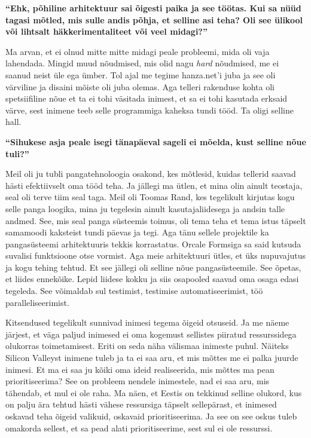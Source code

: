 \textbf{\enquote{Ehk, põhiline arhitektuur sai õigesti paika ja see töötas. Kui 
sa nüüd tagasi mõtled, mis sulle andis põhja, et selline asi teha? Oli see 
ülikool või lihtsalt häkkerimentaliteet või veel midagi?}}

Ma arvan, et ei olnud mitte mitte midagi peale probleemi, mida oli vaja 
lahendada. Mingid muud nõudmised, mis olid nagu \emph{hard} nõudmised, me ei 
saanud neist üle ega ümber. Tol ajal me tegime hanza.net'i 
juba ja see oli värviline ja disaini mõiste oli juba olemas. Aga telleri 
rakenduse kohta oli spetsiifiline nõue et ta ei tohi väsitada inimest, et sa ei 
tohi kasutada erksaid värve, sest inimene teeb selle programmiga kaheksa tundi 
tööd. Ta oligi selline hall.

\textbf{\enquote{Sihukese asja peale isegi tänapäeval sageli ei mõelda, kust 
selline nõue tuli?}}

Meil oli ju tubli pangatehnoloogia osakond, kes mõtlesid, kuidas tellerid saavad 
hästi efektiivselt oma tööd teha. Ja jällegi ma ütlen, et mina olin ainult 
teostaja, seal oli terve tiim seal taga. Meil oli Toomas Rand, kes tegelikult kirjutas kogu selle panga loogika, mina ju tegelesin 
ainult kasutajaliidesega ja andsin talle andmed. See, mis seal panga süsteemis 
toimus, oli tema teha et tema istus täpselt samamoodi kaksteist tundi päevas ja 
tegi. Aga tänu sellele projektile ka pangasüsteemi arhitektuuris tekkis 
korrastatus. Orcale Formsiga sa said kutsuda suvalisi funktsioone otse vormist. 
Aga meie arhitektuuri ütles, et üks nupuvajutus ja kogu tehing tehtud. Et see 
jällegi oli selline nõue pangasüsteemile. See õpetas, et liides ennekõike. 
Lepid liidese kokku ja siis osapooled saavad oma osaga  edasi tegeleda. See 
võimaldab sul testimist, testimise automatiseerimist, töö paralleliseerimist. 

Kitsendused tegelikult sunnivad inimesi tegema õigeid otsuseid. Ja me näeme 
järjest, et väga paljud inimesed ei oma kogemust sellistes piiratud  
ressurssidega olukorras toimetamisest. Eriti on seda näha välismaa inimeste 
puhul. Näiteks Silicon Valleyst inimene tuleb ja ta ei saa aru, et mis mõttes 
me ei palka juurde inimesi. Et ma ei saa ju kõiki oma ideid realiseerida, mis 
mõttes ma pean prioritiseerima? See on probleem nendele inimestele, nad ei saa 
aru, mis tähendab, et mul ei ole raha. Ma näen, et Eestis on tekkinud selline 
olukord, kus on palju ära tehtud hästi vähese ressursiga täpselt sellepärast, 
et inimesed oskavad teha õigeid valikuid, oskavaid prioritiseerima. Ja see on 
see oskus tuleb omakorda sellest, et sa pead alati prioritiseerime, sest sul ei 
ole ressurssi.

